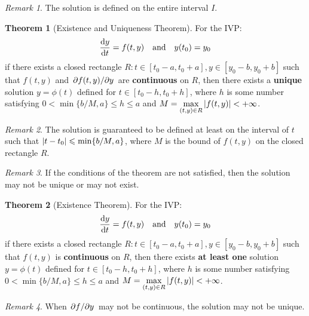 \documentclass[10pt,UTF8]{article}
\newenvironment{theoremBox}
{
  \begin{tcolorbox}[colback=yellow!5!white,colframe=yellow!75!black,parbox=false,before
  upper=\par,before lower=\par]}
  {
\end{tcolorbox}}
\theoremstyle{definition}
\newtheorem{definition inner}{Definition}[section]
\theoremstyle{definition}
\newtheorem{theorem inner}{Theorem}[section]
\newenvironment{theorem}[1][]
{
  \begin{theoremBox}
  \begin{theorem inner}[#1]\hfill\par}
    {
    \end{theorem inner}
\end{theoremBox}}
\theoremstyle{definition}
\newtheorem*{proof inner}{\textit{Proof}}
\theoremstyle{plain}
\newtheorem{tip inner}{Tip}[section]
\theoremstyle{remark}
\newtheorem*{remark}{\textit{Remark}}
\begin{document}
\begin{remark}
  The solution is defined on the entire interval \(I\).
\end{remark}

\begin{theorem}[Existence and Uniqueness Theorem]
  {}\label{thm: Existence and Uniqueness Theorem}
  For the IVP\@:
  \begin{equation*}
    \dv{y}{t} = f(t,y) \qand y(t_0) = y_0
  \end{equation*}
  if there exists a closed rectangle
  \(R: t \in [t_0 - a, t_0 + a], y \in [y_0 - b, y_0 + b]\)
  such that \(f(t,y)\) and \(\pdv*{f(t,y)}{y}\)
  are \textbf{continuous} on \(R\),
  then there exists a \textbf{unique} solution \(y = \phi(t)\)
  defined for \(t \in [t_0 - h, t_0 + h]\),
  where \(h\) is some number satisfying
  \(0 < \min \{b/M, a\} \leqslant h \leqslant a \)
  and \(M = \max\limits_{(t,y) \in R}\abs{f(t,y)} < +\infty \).
\end{theorem}

\begin{remark}
  The solution is guaranteed to be defined at least on the interval of \(t\)
  such that \(\abs{t - t_0} \leqslant \min \{b/M, a\} \),
  where \(M\) is the bound of \(f(t,y)\) on the closed rectangle \(R\).
\end{remark}

\begin{remark}
  If the conditions of the theorem are not satisfied,
  then the solution may not be unique or may not exist.
\end{remark}

\begin{theorem}[Existence Theorem]
  For the IVP\@:
  \begin{equation*}
    \dv{y}{t} = f(t,y) \qand y(t_0) = y_0
  \end{equation*}
  if there exists a closed rectangle
  \(R: t \in [t_0 - a, t_0 + a], y \in [y_0 - b, y_0 + b]\)
  such that \(f(t,y)\) is \textbf{continuous} on \(R\),
  then there exists \textbf{at least one} solution \(y = \phi(t)\)
  defined for \(t \in [t_0 - h, t_0 + h]\),
  where \(h\) is some number satisfying
  \(0 < \min \{b/M, a\} \leqslant h \leqslant a \)
  and \(M = \max\limits_{(t,y) \in R}\abs{f(t,y)} < +\infty \).
\end{theorem}
\begin{remark}
  When \(\pdv*{f}{y}\) may not be continuous, the solution may not be unique.
\end{remark}
\end{document}
